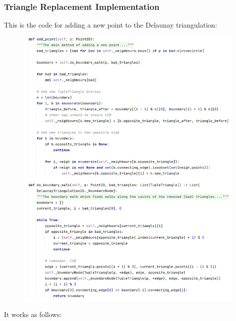 \subsubsection{Triangle Replacement Implementation}
This is the code for adding a new point to the Delaunay triangulation:
\begin{figure}[H]
    \centering
    \includegraphics[width=\textwidth]{add_point_full.png}
\end{figure}
It works as follows:
